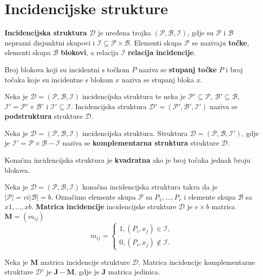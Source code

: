 \section{Incidencijske strukture}

\textbf{Incidencijska struktura} $\mathcal{D}$ je uređena trojka
$(\mathcal{P}, \mathcal{B}, \mathcal{I})$, gdje su
$\mathcal{P}$ i $\mathcal{B}$ neprazni disjunktni skupovi i
$\mathcal{I} \subseteq \mathcal{P} \times \mathcal{B}$.
Elementi skupa $\mathcal{P}$ se nazivaju \textbf{točke}, elementi skupa
$\mathcal{B}$ \textbf{blokovi}, a relacija $\mathcal{I}$
\textbf{relacija incidencije}.

Broj blokova koji su incidentni s točkom $P$ naziva se \textbf{stupanj točke}
$P$ i broj točaka koje su incidentne s blokom $x$ naziva se  stupanj bloka $x$.

\bigskip
\noindent
Neka je $\mathcal{D} = (\mathcal{P}, \mathcal{B}, \mathcal{I})$ incidencijska
struktura te neka je $\mathcal{P}' \subseteq \mathcal{P}$,
$\mathcal{B}' \subseteq \mathcal{B}$,
$\mathcal{I}' = \mathcal{P}' \times \mathcal{B}'$ i
$\mathcal{I}' \subseteq \mathcal{I}$. Incidencijska struktura
$\mathcal{D}' = (\mathcal{P}', \mathcal{B}', \mathcal{I}')$ naziva se
\textbf{podstruktura} strukture $\mathcal{D}$.

\smallskip
\noindent
Neka je $\mathcal{D} = (\mathcal{P}, \mathcal{B}, \mathcal{I})$ incidencijska
struktura. Struktura $\mathcal{D} = (\mathcal{P}, \mathcal{B}, \mathcal{I}')$,
gdje je $\mathcal{I}' = \mathcal{P} \times \mathcal{B} - \mathcal{I}$ naziva se
\textbf{komplementarna struktura} strukture $\mathcal{D}$.

\smallskip
\noindent
Konačna incidencijska struktura je \textbf{kvadratna} ako je broj točaka jednak
broju blokova.

\bigskip
\noindent
Neka je $\mathcal{D} = (\mathcal{P}, \mathcal{B}, \mathcal{I})$ konačna
incidencijska struktura takva da je $|\mathcal{P}| = v i |\mathcal{B}| = b$.
Označimo elemente skupa $\mathcal{P}$ sa $P_1, \dots, P_v$ i elemente skupa
$\mathcal{B}$ sa $x1, \dots, xb$. \textbf{Matrica incidencije} incidencijske
strukture $\mathcal{D}$ je $v \times b$ matrica $\mathbf{M} = (m_{ij})$
$$
m_{ij} = \begin{cases*}
    1, (P_i, x_j) \in \mathcal{I},\\
    0, (P_i, x_j) \notin \mathcal{I}.
\end{cases*}
$$

\noindent
Neka je $\mathbf{M}$ matrica incidencije strukture $\mathcal{D}$. Matrica
incidencije komplementarne strukture $\mathcal{D}'$ je
$\mathbf{J} - \mathbf{M}$, gdje je $\mathbf{J}$ matrica jedinica.

